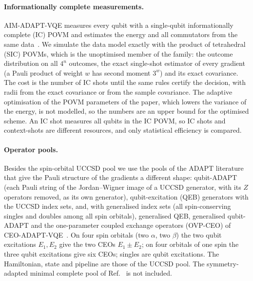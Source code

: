 \documentclass[aps,pra,reprint,superscriptaddress,nofootinbib]{revtex4-2}
\begin{document}
\paragraph{Informationally complete measurements.} AIM-ADAPT-VQE measures every qubit with a single-qubit informationally complete (IC) POVM and estimates the energy and all commutators from the same data~\cite{nykanen2025}. We simulate the data model exactly with the product of tetrahedral (SIC) POVMs, which is the unoptimised member of the family: the outcome distribution on all $4^n$ outcomes, the exact single-shot estimator of every gradient (a Pauli product of weight $w$ has second moment $3^w$) and its exact covariance. The cost is the number of IC shots until the same rules certify the decision, with radii from the exact covariance or from the sample covariance. The adaptive optimisation of the POVM parameters of the paper, which lowers the variance of the energy, is not modelled, so the numbers are an upper bound for the optimised scheme. An IC shot measures all qubits in the IC POVM, so IC shots and context-shots are different resources, and only statistical efficiency is compared.

\paragraph{Operator pools.} Besides the spin-orbital UCCSD pool we use the pools of the ADAPT literature that give the Pauli structure of the gradients a different shape: qubit-ADAPT (each Pauli string of the Jordan--Wigner image of a UCCSD generator, with its $Z$ operators removed, as its own generator), qubit-excitation (QEB) generators with the UCCSD index sets, and, with generalised index sets (all spin-conserving singles and doubles among all spin orbitals), generalised QEB, generalised qubit-ADAPT and the one-parameter coupled exchange operators (OVP-CEO) of CEO-ADAPT-VQE~\cite{ramoa2025ceo}. On four spin orbitals (two $\alpha$, two $\beta$) the two qubit excitations $E_1,E_2$ give the two CEOs $E_1\pm E_2$; on four orbitals of one spin the three qubit excitations give six CEOs; singles are qubit excitations. The Hamiltonian, state and pipeline are those of the UCCSD pool. The symmetry-adapted minimal complete pool of Ref.~\cite{shkolnikov2023} is not included.
\end{document}
